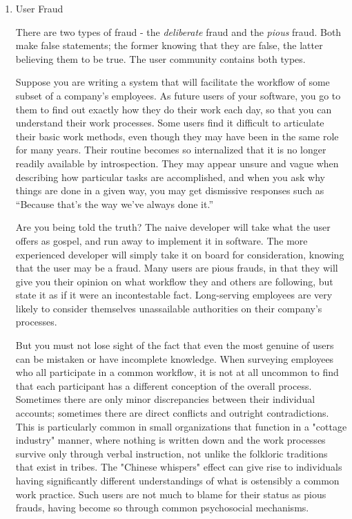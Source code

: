 \documentclass{article}
\begin{document}
\begin{enumerate}
\item User Fraud
\label{sec:orgheadline228}

There are two types of fraud - the \emph{deliberate} fraud and the \emph{pious}
fraud. Both make false statements; the former knowing that they are
false, the latter believing them to be true. The user community contains
both types.

Suppose you are writing a system that will facilitate the workflow of
some subset of a company's employees. As future users of your software,
you go to them to find out exactly how they do their work each day, so
that you can understand their work processes. Some users find it
difficult to articulate their basic work methods, even though they may
have been in the same role for many years. Their routine becomes so
internalized that it is no longer readily available by introspection.
They may appear unsure and vague when describing how particular tasks
are accomplished, and when you ask why things are done in a given way,
you may get dismissive responses such as “Because that's the way we've
always done it.”

Are you being told the truth? The naive developer will take what the
user offers as gospel, and run away to implement it in software. The
more experienced developer will simply take it on board for
consideration, knowing that the user may be a fraud. Many users are
pious frauds, in that they will give you their opinion on what workflow
they and others are following, but state it as if it were an
incontestable fact. Long-serving employees are very likely to consider
themselves unassailable authorities on their company's processes.

But you must not lose sight of the fact that even the most genuine of
users can be mistaken or have incomplete knowledge. When surveying
employees who all participate in a common workflow, it is not at all
uncommon to find that each participant has a different conception of the
overall process. Sometimes there are only minor discrepancies between
their individual accounts; sometimes there are direct conflicts and
outright contradictions. This is particularly common in small
organizations that function in a "cottage industry" manner, where
nothing is written down and the work processes survive only through
verbal instruction, not unlike the folkloric traditions that exist in
tribes. The "Chinese whispers" effect can give rise to individuals
having significantly different understandings of what is ostensibly a
common work practice. Such users are not much to blame for their status
as pious frauds, having become so through common psychosocial
mechanisms.


\end{enumerate}
\end{document}
